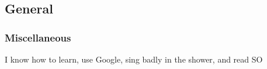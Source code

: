 \documentclass[]{two-column-resume}
\begin{document}
{\begin{minipage}[t]{0.34\textwidth}
\subsection{General}








\subsubsection{Miscellaneous}
I know how to learn, use Google, sing badly in the shower, and read SO
\setlength{\parindent}{0ex}
    \sectionsep

%
%

%
%

%
%

%
%

\end{minipage}        \hfill%
\begin{minipage}[t]{0.65\textwidth}

%
%

\end{minipage}}
\end{document}
